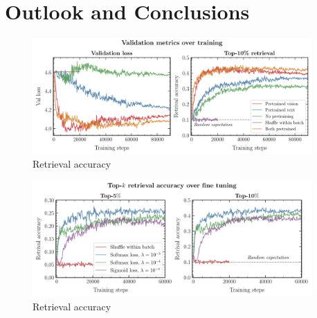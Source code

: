 \documentclass[10pt]{article} %
\begin{document}
\section{Outlook and Conclusions}
\label{sec:conclusion}



  

\begin{figure}[!h]
      \includegraphics[width=0.95\textwidth]{plots/val_metrics.pdf}
      \caption{Retrieval accuracy}
      \label{fig:retrieval_acc}
      \end{figure}
      

\begin{figure}[!h]
\includegraphics[width=0.95\textwidth]{plots/retrieval_acc.pdf}
\caption{Retrieval accuracy}
\label{fig:retrieval_acc}
\end{figure}
\end{document}
